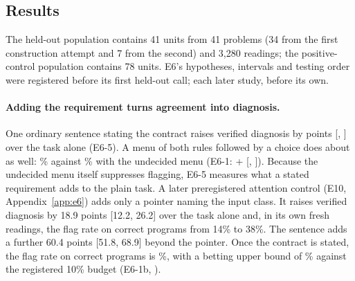 \subsection{Results}
\label{sec:e6-results}

The held-out population contains 41 units from 41 problems (34 from the first construction attempt and 7 from the
second) and 3{,}280 readings; the positive-control population contains 78 units. E6's hypotheses, intervals and
testing order were registered before its first held-out call; each later study, before its own.

\paragraph{Adding the requirement turns agreement into diagnosis.} One ordinary sentence stating the contract
raises verified diagnosis by \NSixFive{} points [\NSixFiveLo, \NSixFiveHi] over the task alone (E6-5). A menu of both
rules followed by a choice does about as well: \NSixResolveCov\% against \NSixMenuCov\% with the undecided menu (E6-1:
+\NSixOne{} [\NSixOneLo, \NSixOneHi]). Because the undecided menu itself suppresses flagging, E6-5 measures what a
stated requirement adds to the plain task. A later preregistered attention control (E10, Appendix~\ref{app:e6}) adds
only a pointer naming the input class. It raises verified diagnosis by 18.9 points [12.2, 26.2] over the task alone
and, in its own fresh readings, the flag rate on correct programs from 14\% to 38\%. The sentence adds a
further 60.4 points [51.8, 68.9] beyond the pointer. Once the contract is
stated, the flag rate on correct programs is \NSixResolveFpr\%, with a betting upper bound of \NSixResolveFprUp\%
against the registered 10\% budget (E6-1b, \NSixOneBVerdict).

